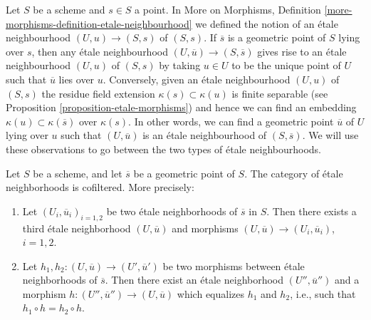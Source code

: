 \begin{remark}
\label{remark-etale-neighbourhoods}
Let $S$ be a scheme and $s \in S$ a point. In
More on Morphisms,
Definition \ref{more-morphisms-definition-etale-neighbourhood}
we defined the notion of an \'etale neighbourhood $(U, u) \to (S, s)$
of $(S, s)$. If $\overline{s}$ is a geometric point of $S$ lying over
$s$, then any \'etale neighbourhood $(U, \overline{u}) \to (S, \overline{s})$
gives rise to an \'etale neighbourhood $(U, u)$ of $(S, s)$ by taking
$u \in U$ to be the unique point of $U$ such that $\overline{u}$
lies over $u$. Conversely, given an \'etale neighbourhood $(U, u)$
of $(S, s)$ the residue field extension $\kappa(s) \subset \kappa(u)$
is finite separable (see
Proposition \ref{proposition-etale-morphisms})
and hence we can find an embedding $\kappa(u) \subset \kappa(\overline{s})$
over $\kappa(s)$. In other words, we can find a geometric point
$\overline{u}$ of $U$ lying over $u$ such that $(U, \overline{u})$
is an \'etale neighbourhood of $(S, \overline{s})$.
We will use these observations to go between the two types of
\'etale neighbourhoods.
\end{remark}

\begin{lemma}
\label{lemma-cofinal-etale}
Let $S$ be a scheme, and let $\overline{s}$ be a geometric point of $S$.
The category of \'etale neighborhoods is cofiltered. More precisely:
\begin{enumerate}
\item Let $(U_i, \overline{u}_i)_{i=1, 2}$ be two \'etale neighborhoods of
$\overline{s}$ in $S$. Then there exists a third \'etale neighborhood
$(U, \overline{u})$ and morphisms
$(U, \overline{u}) \to (U_i, \overline{u}_i)$, $i = 1, 2$.
\item Let $h_1, h_2: (U, \overline{u}) \to (U', \overline{u}')$ be two
morphisms between \'etale neighborhoods of $\overline{s}$. Then there exist an
\'etale neighborhood $(U'', \overline{u}'')$ and a morphism
$h : (U'', \overline{u}'') \to (U, \overline{u})$
which equalizes $h_1$ and $h_2$, i.e., such that
$h_1 \circ h = h_2 \circ h$.		
\end{enumerate}
\end{lemma}

